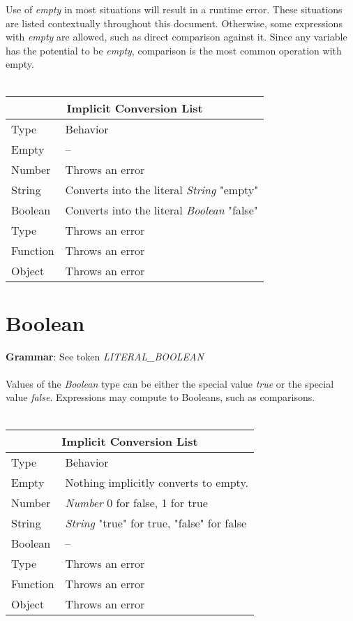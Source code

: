 \documentclass[12pt,letterpaper]{report}
\begin{document}
Use of \textit{empty} in most situations will result in a runtime error. These situations 
are listed contextually throughout this document. Otherwise, some expressions with 
\textit{empty} are allowed, such as direct comparison against it. Since any variable 
has the potential to be \textit{empty}, comparison is the most common operation with 
empty.
\\\\
{
\centering
\begin{tabular}{ |p{2.5cm}||p{10cm}|  }
  \hline
  \multicolumn{2}{|c|}{Implicit Conversion List} \\
  \hline
  Type & Behavior\\
  \hline
  Empty & --\\
  Number  & Throws an error \\
  String & Converts into the literal \textit{String} "empty"\\
  Boolean & Converts into the literal \textit{Boolean} "false"\\
  Type & Throws an error\\
  Function & Throws an error\\
  Object & Throws an error\\
 \hline
\end{tabular}
}




\section{Boolean}\label{Boolean}

\textbf{Grammar}: See token \textit{LITERAL\_BOOLEAN}
\\\\
Values of the \textit{Boolean} type can be either the special value \textit{true} or 
the special value \textit{false}. Expressions may compute to Booleans, such 
as comparisons.
\\\\
{
\centering
\begin{tabular}{ |p{2.5cm}||p{10cm}|  }
  \hline
  \multicolumn{2}{|c|}{Implicit Conversion List} \\
  \hline
  Type & Behavior\\
  \hline
  Empty & Nothing implicitly converts to empty.\\
  Number  & \textit{Number} 0 for false, 1 for true \\
  String & \textit{String} "true" for true, "false" for false\\
  Boolean & -- \\
  Type & Throws an error\\
  Function & Throws an error\\
  Object & Throws an error\\
 \hline
\end{tabular}
}
\end{document}
